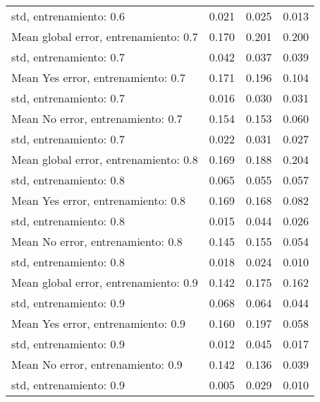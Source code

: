 \begin{longtable}{p{4cm}|p{1.5cm}|p{1.5cm}|p{1.5cm}}
std, entrenamiento: 0.6               &        0.021 &     0.025 &                        0.013 \\
Mean global error, entrenamiento: 0.7 &        0.170 &     0.201 &                        0.200 \\
std, entrenamiento: 0.7               &        0.042 &     0.037 &                        0.039 \\
Mean Yes error, entrenamiento: 0.7    &        0.171 &     0.196 &                        0.104 \\
std, entrenamiento: 0.7               &        0.016 &     0.030 &                        0.031 \\
Mean No error, entrenamiento: 0.7     &        0.154 &     0.153 &                        0.060 \\
std, entrenamiento: 0.7               &        0.022 &     0.031 &                        0.027 \\
Mean global error, entrenamiento: 0.8 &        0.169 &     0.188 &                        0.204 \\
std, entrenamiento: 0.8               &        0.065 &     0.055 &                        0.057 \\
Mean Yes error, entrenamiento: 0.8    &        0.169 &     0.168 &                        0.082 \\
std, entrenamiento: 0.8               &        0.015 &     0.044 &                        0.026 \\
Mean No error, entrenamiento: 0.8     &        0.145 &     0.155 &                        0.054 \\
std, entrenamiento: 0.8               &        0.018 &     0.024 &                        0.010 \\
Mean global error, entrenamiento: 0.9 &        0.142 &     0.175 &                        0.162 \\
std, entrenamiento: 0.9               &        0.068 &     0.064 &                        0.044 \\
Mean Yes error, entrenamiento: 0.9    &        0.160 &     0.197 &                        0.058 \\
std, entrenamiento: 0.9               &        0.012 &     0.045 &                        0.017 \\
Mean No error, entrenamiento: 0.9     &        0.142 &     0.136 &                        0.039 \\
std, entrenamiento: 0.9               &        0.005 &     0.029 &                        0.010 \\

\end{longtable}
